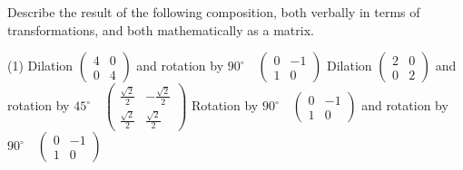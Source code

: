 \begin{enumerate}
Describe the result of the following composition, both verbally in terms of transformations, and both mathematically as a matrix.
\begin{tasks}[after-skip = 150pt, after-item-skip = 150pt](1)
\task Dilation $\begin{pmatrix} 4 & 0 \\ 0 & 4 \end{pmatrix}$ and rotation by $90^{\circ} \quad \begin{pmatrix} 0 & -1\\ 1& 0 \end{pmatrix}$
\task Dilation $\begin{pmatrix} 2 & 0 \\ 0 & 2 \end{pmatrix}$ and rotation by $45^{\circ} \quad \begin{pmatrix} \frac{\sqrt{2}}{2} & -\frac{\sqrt{2}}{2} \\ \frac{\sqrt{2}}{2} & \frac{\sqrt{2}}{2} \end{pmatrix}$
\task Rotation by $90^{\circ} \quad \begin{pmatrix} 0 & -1 \\ 1 & 0 \end{pmatrix}$ and rotation by $90^{\circ} \quad \begin{pmatrix} 0 & -1\\ 1& 0 \end{pmatrix}$
\end{tasks}


\end{enumerate}